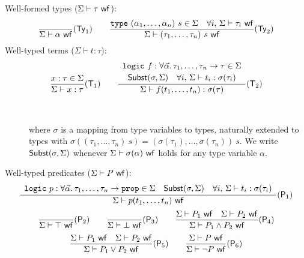 \documentclass[a4paper,12pt]{report}
\begin{document}
Well-formed types ($\Sigma\vdash\tau~\mathsf{wf}$):
\begin{displaymath}
  \frac{}{\Sigma\vdash\alpha~\mathsf{wf}}(\mathsf{Ty}_1)
  \qquad
  \frac{\mathtt{type}~(\alpha_1,\dots,\alpha_n)~s\in\Sigma
        \quad
        \forall i,\,\Sigma\vdash\tau_i~\mathsf{wf}}
       {\Sigma\vdash(\tau_1,\dots,\tau_n)~s~\mathsf{wf}}(\mathsf{Ty}_2)
\end{displaymath}
Well-typed terms ($\Sigma\vdash t:\tau$):
\begin{displaymath}
  \frac{x:\tau\in\Sigma}{\Sigma\vdash x:\tau}(\mathsf{T}_1)
  \qquad
  \frac{
    \begin{array}{c}
      \texttt{logic}~f:\forall\vec{\alpha}.\,\tau_1,\dots,\tau_n\rightarrow\tau\in\Sigma \\[0.2em]
      \mathsf{Subst}(\sigma,\Sigma) \quad
       \forall i,\, \Sigma\vdash t_i:\sigma(\tau_i) \\
    \end{array}}
       {\Sigma\vdash f(t_1,\dots,t_n):\sigma(\tau)}(\mathsf{T}_2)
\end{displaymath}
\begin{description}
\item[~~~]
  where $\sigma$ is a mapping from type variables to types, naturally
  extended to types with $\sigma((\tau_1,\dots,\tau_n)~s) =
  (\sigma(\tau_1),\dots,\sigma(\tau_n))~s$. 
  We write $\mathsf{Subst}(\sigma,\Sigma)$ whenever
  $\Sigma\vdash\sigma(\alpha)~\mathsf{wf}$ holds for any type variable $\alpha$.
\end{description}
Well-typed predicates ($\Sigma\vdash P~\mathsf{wf}$):
\begin{displaymath}
 \frac{
    \begin{array}{c}
      \texttt{logic}~p:\forall\vec{\alpha}.\,\tau_1,\dots,\tau_n\rightarrow\mathtt{prop}\in\Sigma \quad
        \mathsf{Subst}(\sigma,\Sigma) \quad
        \forall i,\,\Sigma\vdash t_i:\sigma(\tau_i) \\
    \end{array}}
       {\Sigma\vdash p(t_1,\dots,t_n)~\mathsf{wf}}(\mathsf{P}_1)
\end{displaymath}
\begin{displaymath}
  \frac{}
       {\Sigma\vdash\top~\mathsf{wf}}(\mathsf{P}_2)
  \qquad
  \frac{}
       {\Sigma\vdash\bot~\mathsf{wf}}(\mathsf{P}_3)
  \qquad
  \frac{\Sigma\vdash P_1~\mathsf{wf} \quad \Sigma\vdash P_2~\mathsf{wf}}
       {\Sigma\vdash P_1\land P_2~\mathsf{wf}}(\mathsf{P}_4)
\end{displaymath}
\begin{displaymath}
  \frac{\Sigma\vdash P_1~\mathsf{wf} \quad \Sigma\vdash P_2~\mathsf{wf}}
       {\Sigma\vdash P_1\lor P_2~\mathsf{wf}}(\mathsf{P}_5)
  \qquad
  \frac{\Sigma\vdash P~\mathsf{wf}}
       {\Sigma\vdash\lnot P~\mathsf{wf}}(\mathsf{P}_6)
\end{displaymath}
\end{document}

